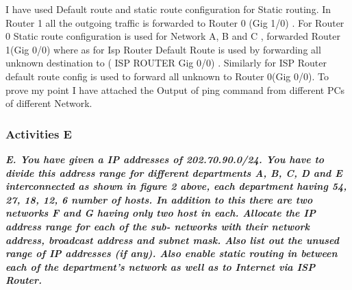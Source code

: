 \documentclass[a4paper,11pt]{article}
\begin{document}
I have used Default route and static route configuration for Static routing. In Router 1 all the outgoing traffic is forwarded to Router 0 (Gig 1/0) . For Router 0  Static route configuration is used for Network A, B and C , forwarded  Router 1(Gig 0/0) where as for Isp Router Default Route is used by forwarding all unknown destination to ( ISP ROUTER Gig 0/0) . Similarly for ISP Router default route config is used to forward all unknown to Router 0(Gig 0/0). To prove my point I have attached the Output of ping command  from different PCs of different Network.




\pagebreak

%
%
%
%
%
%
%
%




\subsubsection{Activities E}

{\bfseries \textit{E. You have given a IP addresses of 202.70.90.0/24. You have to divide this address range for
        different departments A, B, C, D and E interconnected as shown in figure 2 above, each
        department having 54, 27, 18, 12, 6 number of hosts. In addition to this there are two networks
        F and G having only two host in each. Allocate the IP address range for each of the sub-
        networks with their network address, broadcast address and subnet mask. Also list out the
        unused range of IP addresses (if any). Also enable static routing in between each of the
        department’s network as well as to Internet via ISP Router.}}
\end{document}
